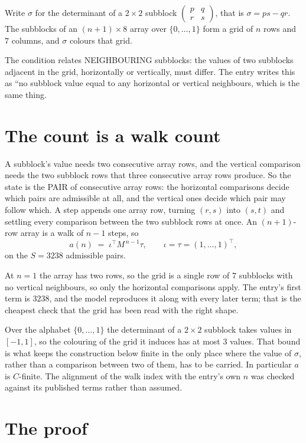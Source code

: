 \documentclass[11pt,a4paper]{article}
\theoremstyle{plain}
\theoremstyle{definition}
\begin{document}
Write $\sigma$ for the determinant of a $2\times2$ subblock
$\begin{pmatrix}p&q\\r&s\end{pmatrix}$, that is $\sigma=ps-qr$. The subblocks of an
$(n+1)\times8$ array over $\{0,\dots,1\}$ form a grid of $n$ rows and $7$
columns, and $\sigma$ colours that grid.

The condition relates NEIGHBOURING subblocks: the values of two subblocks adjacent in the grid,
horizontally or vertically, must differ. The entry writes this as ``no subblock value equal to any horizontal or vertical neighbours, which is the same thing.

\section{The count is a walk count}

A subblock's value needs two consecutive array rows, and the vertical
comparison needs the two subblock rows that three consecutive array rows produce. So the state
is the PAIR of consecutive array rows: the horizontal comparisons decide which pairs are
admissible at all, and the vertical ones decide which pair may follow which. A step appends one
array row, turning $(r,s)$ into $(s,t)$ and settling every comparison between the two subblock
rows at once. An $(n+1)$-row array is a walk of $n-1$ steps, so
\[
a(n)\;=\;\iota^{\!\top}M^{\,n-1}\tau,\qquad\iota=\tau=(1,\dots,1)^{\!\top},
\]
on the $S=3238$ admissible pairs.

At $n=1$ the array has two rows, so the grid is a single row of $7$
subblocks with no vertical neighbours, so only the horizontal comparisons apply. The
entry's first term is $3238$, and the model reproduces it along with every later term; that
is the cheapest check that the grid has been read with the right shape.

Over the alphabet $\{0,\dots,1\}$ the determinant of a $2\times2$ subblock takes values in
$[-1,1]$, so the colouring of the grid it induces has at most $3$ values.
That bound is what keeps the construction below finite in the only place where the value of
$\sigma$, rather than a comparison between two of them, has to be carried.
In particular $a$ is $C$-finite. The alignment of the walk index with the entry's own $n$ was
checked against its published terms rather than assumed.

\section{The proof}
\end{document}
